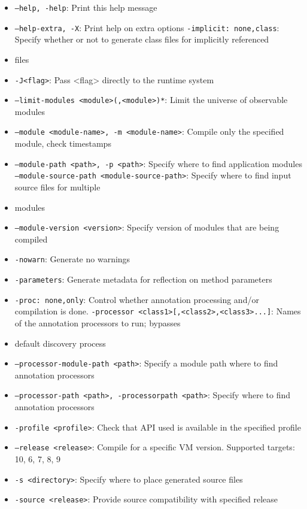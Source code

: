 \documentclass[11pt,letterpaper]{article}
\begin{document}
\begin{enumerate}
\begin{itemize}
            \item \texttt{--help, -help}: Print this help message
            \item \texttt{--help-extra, -X}: Print help on extra options
            \texttt{-implicit: none,class}: Specify whether or not to generate class files for implicitly referenced \item files
            \item \texttt{-J<flag>}: Pass <flag> directly to the runtime system
            \item \texttt{--limit-modules <module>(,<module>)*}: Limit the universe of observable modules
            \item \texttt{--module <module-name>, -m <module-name>}: Compile only the specified module, check timestamps
            \item \texttt{--module-path <path>, -p <path>}: Specify where to find application modules
            \texttt{--module-source-path <module-source-path>}: Specify where to find input source files for multiple \item modules
            \item \texttt{--module-version <version>}: Specify version of modules that are being compiled
            \item \texttt{-nowarn}: Generate no warnings
            \item \texttt{-parameters}: Generate metadata for reflection on method parameters
            \item \texttt{-proc: none,only}: Control whether annotation processing and/or compilation is done.
            \texttt{-processor <class1>[,<class2>,<class3>...]}: Names of the annotation processors to run; bypasses \item default discovery process
            \item \texttt{--processor-module-path <path>}: Specify a module path where to find annotation processors
            \item \texttt{--processor-path <path>, -processorpath <path>}: Specify where to find annotation processors
            \item \texttt{-profile <profile>}: Check that API used is available in the specified profile
            \item \texttt{--release <release>}: Compile for a specific VM version. Supported targets: 10, 6, 7, 8, 9
            \item \texttt{-s <directory>}: Specify where to place generated source files
            \item \texttt{-source <release>}: Provide source compatibility with specified release

\end{itemize}
\end{enumerate}
\end{document}
